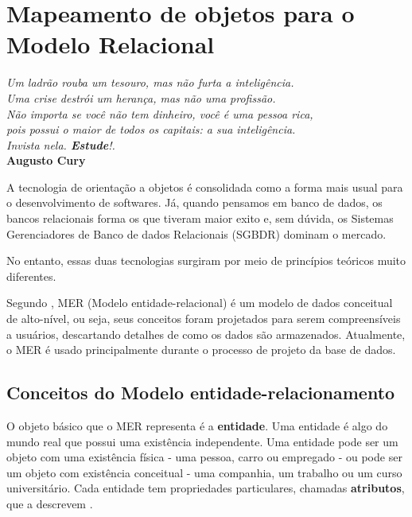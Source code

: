 \chapter{Mapeamento de objetos para o Modelo Relacional}\label{cap:cap1}

\begin{flushright}
	\textit{
		Um ladrão rouba um tesouro, mas não furta a inteligência. \\
		Uma crise destrói um herança, mas não uma profissão. \\ Não importa se você não tem dinheiro, você é uma pessoa rica, \\ pois possui o maior de todos os capitais: a sua inteligência. \\ Invista nela. \textbf{Estude}!.
	} \\
	
	\textbf{Augusto Cury}
\end{flushright}

A tecnologia de orientação a objetos é consolidada como a forma mais usual para o desenvolvimento de softwares. Já, quando pensamos em banco de dados, os bancos relacionais forma os que tiveram maior exito e, sem dúvida, os Sistemas Gerenciadores de Banco de dados Relacionais (SGBDR) dominam o mercado. 

No entanto, essas duas tecnologias surgiram por meio de princípios teóricos muito diferentes. 

Segundo , MER (Modelo entidade-relacional) é um modelo de dados conceitual de alto-nível, ou seja, seus conceitos foram projetados para serem compreensíveis a usuários, descartando detalhes de como os dados são armazenados. Atualmente, o MER é usado principalmente durante o processo de projeto da base de dados.

\section{Conceitos do Modelo entidade-relacionamento}

O objeto básico que o MER representa é a \textbf{entidade}. Uma entidade é algo do mundo real que possui uma existência independente. Uma entidade pode ser um objeto com uma existência
física - uma pessoa, carro ou empregado - ou pode ser um objeto com existência conceitual -
uma companhia, um trabalho ou um curso universitário. Cada entidade tem propriedades
particulares, chamadas \textbf{atributos}, que a descrevem \cite{ferreira2009banco}. 
